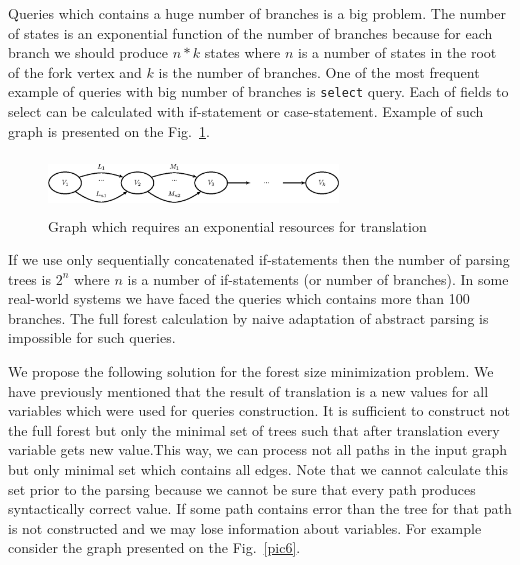 Queries which contains a huge number of branches is a big problem. The number of states is an 
exponential function of the number of branches because for each branch we should produce $n*k$ 
states where $n$ is a number of states in the root of the fork vertex and $k$ is the number 
of branches. One of the most frequent example of queries with big number of branches 
is \verb|select| query. Each of fields to select can be calculated with if-statement 
or case-statement. Example of such graph is presented on the Fig.~\ref{pic5}.

\begin{figure}
    \begin{center}
        \includegraphics[width=7.7cm,height=1.5cm]{graphs/big_res.eps}
        \caption{Graph which requires an exponential resources for translation}
        \label{pic5}
    \end{center}
\end{figure}

If we use only sequentially concatenated if-statements then the number of parsing trees is $2^n$ 
where $n$ is a number of if-statements (or number of branches). In some real-world systems we 
have faced the queries which contains more than 100 branches. The full forest calculation by naive 
adaptation of abstract parsing is impossible for such queries. 



We propose the following solution for the forest size minimization problem. We have previously mentioned 
that the result of translation is a new values for all variables which were used for queries construction. 
It is sufficient to construct not the full forest but only the minimal set of trees such that after 
translation every variable gets new value.This way, we can process not all paths in the input graph 
but only minimal set which contains all edges. Note that we cannot calculate this set prior to the parsing 
because we cannot be sure that every path produces syntactically correct value. If some path contains 
error than the tree for that path is not constructed and we may lose information about variables. 
For example consider the graph presented on the Fig.~\ref{pic6}.

